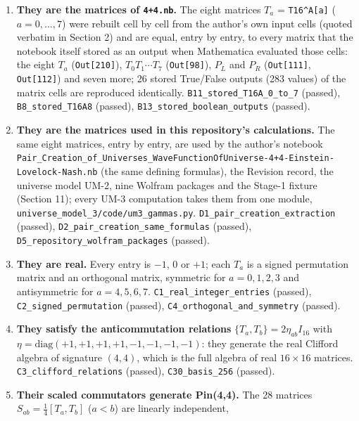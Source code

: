 \documentclass[
  10pt,
]{article}
\providecommand{\tightlist}{%
  \setlength{\itemsep}{0pt}\setlength{\parskip}{0pt}}
\begin{document}
\begin{enumerate}
\def\labelenumi{\arabic{enumi}.}
\tightlist
\item
  \textbf{They are the matrices of \texttt{4+4.nb}.} The eight matrices
  \(T_a\) = \texttt{T16\^{}A{[}a{]}} (\(a = 0, \dots, 7\)) were rebuilt
  cell by cell from the author's own input cells (quoted verbatim in
  Section 2) and are equal, entry by entry, to every matrix that the
  notebook itself stored as an output when Mathematica evaluated those
  cells: the eight \(T_a\) (\texttt{Out{[}210{]}}),
  \(T_0 T_1 \cdots T_7\) (\texttt{Out{[}98{]}}), \(P_L\) and \(P_R\)
  (\texttt{Out{[}111{]}}, \texttt{Out{[}112{]}}) and seven more; 26
  stored True/False outputs (283 values) of the matrix cells are
  reproduced identically. \texttt{B11\_stored\_T16A\_0\_to\_7} (passed),
  \texttt{B8\_stored\_T16A8} (passed),
  \texttt{B13\_stored\_boolean\_outputs} (passed).
\item
  \textbf{They are the matrices used in this repository's calculations.}
  The same eight matrices, entry by entry, are used by the author's
  notebook
  \texttt{Pair\_Creation\_of\_Universes\_WaveFunctionOfUniverse-4+4-Einstein-Lovelock-Nash.nb}
  (the same defining formulas), the Revision record, the universe model
  UM-2, nine Wolfram packages and the Stage-1 fixture (Section 11);
  every UM-3 computation takes them from one module,
  \texttt{universe\_model\_3/code/um3\_gammas.py}.
  \texttt{D1\_pair\_creation\_extraction} (passed),
  \texttt{D2\_pair\_creation\_same\_formulas} (passed),
  \texttt{D5\_repository\_wolfram\_packages} (passed).
\item
  \textbf{They are real.} Every entry is \(-1\), \(0\) or \(+1\); each
  \(T_a\) is a signed permutation matrix and an orthogonal matrix,
  symmetric for \(a = 0, 1, 2, 3\) and antisymmetric for
  \(a = 4, 5, 6, 7\). \texttt{C1\_real\_integer\_entries} (passed),
  \texttt{C2\_signed\_permutation} (passed),
  \texttt{C4\_orthogonal\_and\_symmetry} (passed).
\item
  \textbf{They satisfy the anticommutation relations}
  \(\{T_a, T_b\} = 2\eta_{ab}I_{16}\) with
  \(\eta = \mathrm{diag}(+1, +1, +1, +1, -1, -1, -1, -1)\): they
  generate the real Clifford algebra of signature \((4,4)\), which is
  the full algebra of real \(16 \times 16\) matrices.
  \texttt{C3\_clifford\_relations} (passed), \texttt{C30\_basis\_256}
  (passed).
\item
  \textbf{Their scaled commutators generate Pin(4,4).} The 28 matrices
  \(S_{ab} = \tfrac14[T_a, T_b]\) (\(a < b\)) are linearly independent,

\end{enumerate}
\end{document}
